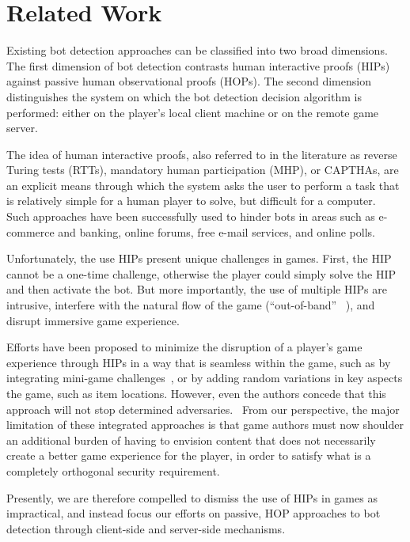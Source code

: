 \documentclass{acm_proc_article-sp}
\begin{document}
\section{Related Work}

Existing bot detection approaches can be classified into two broad dimensions. The first dimension of bot detection contrasts human interactive proofs (HIPs) against passive human observational proofs (HOPs). The second dimension distinguishes the system on which the bot detection decision algorithm is performed: either on the player's local client machine or on the remote game server.

The idea of human interactive proofs, also referred to in the literature as reverse Turing tests (RTTs), mandatory human participation (MHP), or CAPTHAs, are an explicit means through which the system asks the user to perform a task that is relatively simple for a human player to solve, but difficult for a computer.~\cite{embedpoker} Such approaches have been successfully used to hinder bots in areas such as e-commerce and banking, online forums, free e-mail services, and online polls.

Unfortunately, the use HIPs present unique challenges in games. First, the HIP cannot be a one-time challenge, otherwise the player could simply solve the HIP and then activate the bot. But more importantly, the use of multiple HIPs are intrusive, interfere with the natural flow of the game (``out-of-band'' ~\cite{preventbotitem}), and disrupt immersive game experience.

Efforts have been proposed to minimize the disruption of a player's game experience through HIPs in a way that is seamless within the game, such as by integrating mini-game challenges~\cite{minigame}, or by adding random variations in key aspects the game, such as item locations. However, even the authors concede that this approach will not stop determined adversaries.~\cite{preventbotitem} From our perspective, the major limitation of these integrated approaches is that game authors must now shoulder an additional burden of having to envision content that does not necessarily create a better game experience for the player, in order to satisfy what is a completely orthogonal security requirement.

Presently, we are therefore compelled to dismiss the use of HIPs in games as impractical, and instead focus our efforts on passive, HOP approaches to bot detection through client-side and server-side mechanisms.
\end{document}
